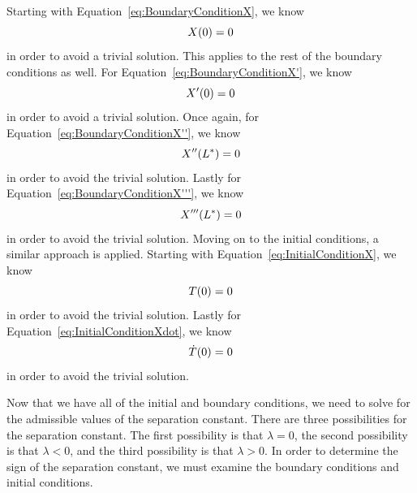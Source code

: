 \documentclass[12pt]{article}
\begin{document}
Starting with Equation~\eqref{eq:BoundaryConditionX}, we know \begin{equation}\label{eq:SimplifiedBoundaryConditionX}
    \centering
    X(0) = 0
\end{equation}
in order to avoid a trivial solution. This applies to the rest of the boundary conditions as well. For Equation~\eqref{eq:BoundaryConditionX'}, we know 
\begin{equation}\label{eq:SimplifiedBoundaryConditionX'}
    \centering
    X'(0) = 0
\end{equation}
in order to avoid a trivial solution. Once again, for Equation~\eqref{eq:BoundaryConditionX''}, we know
\begin{equation}\label{eq:SimplifiedBoundaryConditionX''}
    \centering
    X''(L^*) = 0
\end{equation}
in order to avoid the trivial solution. Lastly for Equation~\eqref{eq:BoundaryConditionX'''}, we know
\begin{equation}\label{eq:SimplifiedBoundaryConditionX'''}
    \centering
    X'''(L^*) = 0
\end{equation}
in order to avoid the trivial solution. Moving on to the initial conditions, a similar approach is applied. Starting with Equation~\eqref{eq:InitialConditionX}, we know
\begin{equation}\label{eq:SimplifiedInitialCondition1}
    \centering
    T(0) = 0 %
\end{equation}
in order to avoid the trivial solution. Lastly for Equation~\eqref{eq:InitialConditionXdot}, we know
\begin{equation}\label{eq:SimplifiedInitialCondition2}
    \centering
    \dot{T}(0) = 0
\end{equation}
in order to avoid the trivial solution.

Now that we have all of the initial and boundary conditions, we need to solve for the admissible values of the separation constant. There are three possibilities for the separation constant. The first possibility is that $\lambda=0$, the second possibility is that $\lambda<0$, and the third possibility is that $\lambda>0$. In order to determine the sign of the separation constant, we must examine the boundary conditions and initial conditions.
\end{document}

